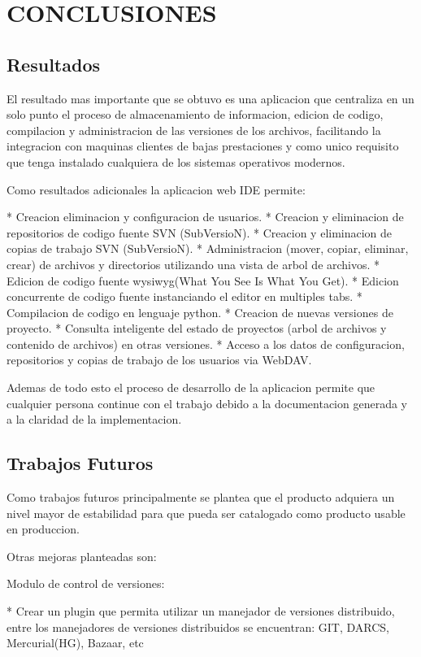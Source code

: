 \section{CONCLUSIONES}

\subsection{Resultados}

El resultado mas importante que se obtuvo es una aplicacion que centraliza en un solo punto el proceso de almacenamiento de informacion, edicion de codigo, compilacion y administracion de las versiones de los archivos, facilitando la integracion con maquinas clientes de bajas prestaciones y como unico requisito que tenga instalado cualquiera de los sistemas operativos modernos.

Como resultados adicionales la aplicacion web IDE permite:

* Creacion eliminacion y configuracion de usuarios.
* Creacion y eliminacion de repositorios de codigo fuente SVN (SubVersioN).
* Creacion y eliminacion de copias de trabajo SVN (SubVersioN).
* Administracion (mover, copiar, eliminar, crear) de archivos y directorios utilizando una vista de arbol de archivos.
* Edicion de codigo fuente wysiwyg(What You See Is What You Get).
* Edicion concurrente de codigo fuente instanciando el editor en multiples tabs.
* Compilacion de codigo en lenguaje python.
* Creacion de nuevas versiones de proyecto.
* Consulta inteligente del estado de proyectos (arbol de archivos y contenido de archivos) en otras versiones.
* Acceso a los datos de configuracion, repositorios y copias de trabajo de los usuarios via WebDAV.

Ademas de todo esto el proceso de desarrollo de la aplicacion permite que cualquier persona continue con el trabajo debido a la documentacion generada y a la claridad de la implementacion.

\subsection{Trabajos Futuros}

Como trabajos futuros principalmente se plantea que el producto adquiera un nivel mayor de estabilidad para que pueda ser catalogado como producto usable en produccion.

Otras mejoras planteadas son:

Modulo de control de versiones:

* Crear un plugin que permita utilizar un manejador de versiones distribuido, entre los manejadores de versiones distribuidos se encuentran: GIT, DARCS, Mercurial(HG), Bazaar, etc

